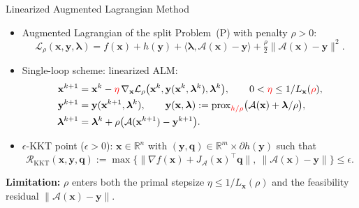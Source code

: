 \documentclass[10pt]{beamer}
\newcommand{\red}[1]{{\color[rgb]{1,0,0}{#1}}}
\newcommand{\blue}[1]{{\usebeamercolor[fg]{frametitle}#1}}
\newcommand{\RR}{\mathbb{R}}
\newcommand{\bx}{\mathbf{x}}
\newcommand{\by}{\mathbf{y}}
\newcommand{\bq}{\mathbf{q}}
\newcommand{\blmbd}{\bm{\lambda}}
\newcommand{\calA}{\mathcal{A}}
\newcommand{\calL}{\mathcal{L}}
\newcommand{\prox}{\operatorname{prox}}
\begin{document}
\begin{frame}{Linearized Augmented Lagrangian Method}
\small

\begin{itemize}
\item Augmented Lagrangian of the split Problem~(P) with penalty $\rho>0$:
    \[
\calL_\rho(\bx,\by,\blmbd)=f(\bx)+h(\by)+\langle\blmbd,\calA(\bx)-\by\rangle+\tfrac{\rho}{2}\|\calA(\bx)-\by\|^2 .
    \]
    \item Single-loop scheme: linearized ALM:
    \[
        \begin{aligned}
            \bx^{k+1}&=\bx^k-\red{\eta}\,\nabla_{\bx}\calL_\rho\bigl(\bx^k,\by(\bx^k,\blmbd^k),\blmbd^k\bigr),\qquad 0<\red{\eta}\le 1/L_{\bx}(\red{\rho}),\\
            \by^{k+1}&=\by(\bx^{k+1},\blmbd^k),\qquad \by(\bx,\blmbd):=\prox_{\red{h/\rho}}\bigl(\calA(\bx)+\blmbd/\rho\bigr),\\
            \blmbd^{k+1}&=\blmbd^k+\rho\bigl(\calA(\bx^{k+1})-\by^{k+1}\bigr).
        \end{aligned}
    \]
    \item $\epsilon$-KKT point ($\epsilon>0$): $\bx\in\RR^n$ with $(\by,\bq)\in\RR^m\times\partial h(\by)$ such that
    \[
        \mathcal R_{\mathrm{KKT}}(\bx,\by,\bq):=\max\bigl\{\|\nabla f(\bx)+J_{\calA}(\bx)^\top\bq\|,\ \|\calA(\bx)-\by\|\bigr\}\le\epsilon .
    \]
\end{itemize}

\vspace{0.2cm}
\blue{\textbf{Limitation:}} $\rho$ enters both the primal stepsize $\eta\le 1/L_{\bx}(\rho)$ and the feasibility residual $\|\calA(\bx)-\by\|$.

\end{frame}
\end{document}
